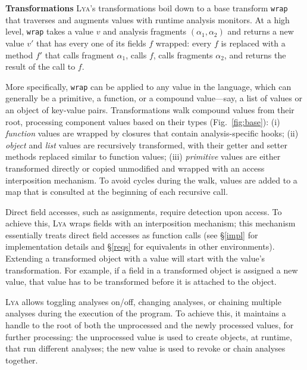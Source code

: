 \documentclass[letterpaper,twocolumn,10pt]{article}
\newcommand{\heading}[1]{\vspace{2pt}\noindent\textbf{#1}\enspace}
\newcommand{\ttt}[1]{\texttt{#1}}
\newcommand{\sys}{{\scshape Lya}\xspace}
\begin{document}
\heading{Transformations}
\sys's transformations boil down to a base transform \ttt{wrap} that traverses and augments values with runtime analysis monitors.
At a high level, \ttt{wrap} takes a value $v$ and analysis fragments $(\alpha_1, \alpha_2)$ and returns a new value $v'$ that has every one of its fields $f$ wrapped:
   every $f$ is replaced with a method $f'$ that calls fragment $\alpha_1$, calls $f$, calls fragments $\alpha_2$, and returns the result of the call to $f$.

More specifically, \ttt{wrap} can be applied to any value in the language, which can generally be a primitive, a function, or a compound value---say, a list of values or an object of key-value pairs.
Transformations walk compound values from their root, processing component values based on their types (Fig.~\ref{fig:base}):
  (i) \emph{function} values are wrapped by closures that contain analysis-specific hooks; %
  (ii) \emph{object} and \emph{list} values are recursively transformed, with their getter and setter methods replaced similar to function values; %
  (iii) \emph{primitive} values are either transformed directly or copied unmodified and wrapped with an access interposition mechanism.
To avoid cycles during the walk, values are added to a map that is consulted at the beginning of each recursive call.

Direct field accesses, such as assignments, require detection upon access.
To achieve this, \sys wraps fields with an interposition mechanism;
  this mechanism essentially treats direct field accesses as function calls (see \S\ref{impl} for implementation details and \S\ref{reqs} for equivalents in other environments).
Extending a transformed object with a value will start with the value's transformation.
For example, if a field in a transformed object is assigned a new value, that value has to be transformed before it is attached to the object.

\sys allows toggling analyses on/off, changing analyses, or chaining multiple analyses during the execution of the program.
To achieve this, it maintains a handle to the root of both the unprocessed and the newly processed values, for further processing:
  the unprocessed value is used to create objects, at runtime, that run different analyses;
  the new value is used to revoke or chain analyses together.
\end{document}
